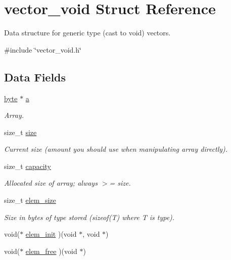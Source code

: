 \hypertarget{structvector__void}{\section{vector\-\_\-void \-Struct \-Reference}
\label{structvector__void}
}


\-Data structure for generic type (cast to void) vectors.  




{\ttfamily \#include \char`\"{}vector\-\_\-void.\-h\char`\"{}}

\subsection*{\-Data \-Fields}
\begin{DoxyCompactItemize}
\item 
\hyperlink{vector__void_8h_a0c8186d9b9b7880309c27230bbb5e69d}{byte} $\ast$ \hyperlink{structvector__void_aae6cbf085d4de1f6ba3adab1aa7c7585}{a}
\begin{DoxyCompactList}\small\item\em \-Array. \end{DoxyCompactList}\item 
size\-\_\-t \hyperlink{structvector__void_a94e09482f6122993461724a988ae6f92}{size}
\begin{DoxyCompactList}\small\item\em \-Current size (amount you should use when manipulating array directly). \end{DoxyCompactList}\item 
size\-\_\-t \hyperlink{structvector__void_a440146243caeb1d285111fdd54e1006f}{capacity}
\begin{DoxyCompactList}\small\item\em \-Allocated size of array; always $>$= size. \end{DoxyCompactList}\item 
size\-\_\-t \hyperlink{structvector__void_afedda26ce85492462b79dae9090c49f6}{elem\-\_\-size}
\begin{DoxyCompactList}\small\item\em \-Size in bytes of type stored (sizeof(\-T) where \-T is type). \end{DoxyCompactList}\item 
void($\ast$ \hyperlink{structvector__void_af5d27d7e1af89d5dfbcf49f1810cc0c2}{elem\-\_\-init} )(void $\ast$, void $\ast$)
\item 
void($\ast$ \hyperlink{structvector__void_abed2ac06e76256419b825b31e879b204}{elem\-\_\-free} )(void $\ast$)
\end{DoxyCompactItemize}



